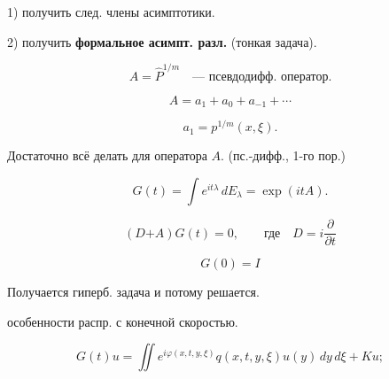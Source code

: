 1) получить след. члены асимптотики.

2) получить \textbf{формальное асимпт. разл.} (тонкая задача).

\begin{equation*}A=\hat P^{1/m}\quad\text{--- псевдодифф. оператор.}\end{equation*}

\begin{equation*}A=a_1+a_0+a_{-1}+\cdots\end{equation*}

\begin{equation*}a_1=p^{1/m}(x,\xi).\end{equation*}

Достаточно всё делать для оператора $A$. (пс.-дифф., 1-го пор.)

\begin{equation*}G(t)=\int e^{it\lambda}\,dE_\lambda=\exp(itA).\end{equation*}


\begin{equation*}
(D\mathbin{\boldsymbol{+}}A)G(t)=0,\qquad\text{где}\quad D=i\frac{\partial}{\partial t}
\end{equation*}

\begin{equation*}G(0)=I\end{equation*}

Получается гиперб. задача и потому решается.

 особенности распр. с конечной скоростью.

\begin{equation*}
G(t)u=\iint e^{i\varphi(x,t,y,\xi)}q(x,t,y,\xi)u(y)\,dy\,d\xi+Ku;
\end{equation*}

